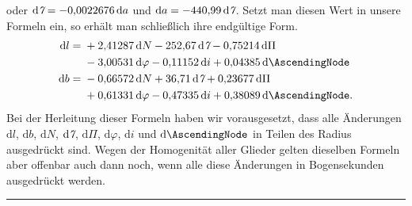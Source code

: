 \noindent oder $\mathrm{d}\mathord{\text{\itshape 7}}=-0{,}0022676\,\mathrm{d}a$ und $\mathrm{d}a=-440{,}99\,\mathrm{d}\mathord{\text{\itshape 7}}$. Setzt man diesen Wert in unsere Formeln ein, so erhält man schließlich ihre endgültige Form.
\[
\begin{aligned}
\mathrm{d}l={}&+2{,}41287\,\mathrm{d}N-252{,}67\,\mathrm{d}\DailyMotionSign-0{,}75214\,\mathrm{d}\Pi\\
 &-3{,}00531\,\mathrm{d}\varphi-0{,}11152\,\mathrm{d}i+0{,}04385\,\mathrm{d}\AscendingNode\\
\mathrm{d}b={}&-0{,}66572\,\mathrm{d}N+36{,}71\,\mathrm{d}\DailyMotionSign+0{,}23677\,\mathrm{d}\Pi\\
 &+0{,}61331\,\mathrm{d}\varphi-0{,}47335\,\mathrm{d}i+0{,}38089\,\mathrm{d}\AscendingNode.
\end{aligned}
\]
Bei der Herleitung dieser Formeln haben wir vorausgesetzt, dass alle Änderungen $\mathrm{d}l$, $\mathrm{d}b$, $\mathrm{d}N$, $\mathrm{d}\mathord{\text{\itshape 7}}$, $\mathrm{d}\Pi$, $\mathrm{d}\varphi$, $\mathrm{d}i$ und $\mathrm{d}\AscendingNode$ in Teilen des Radius ausgedrückt sind. Wegen der Homogenität aller Glieder gelten dieselben Formeln aber offenbar auch dann noch, wenn alle diese Änderungen in Bogensekunden ausgedrückt werden.
\begin{center}\rule{7em}{.4pt}\end{center}
